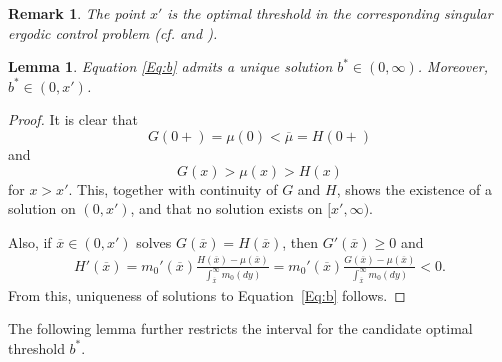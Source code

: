 \documentclass[12pt]{article}
\newtheorem{lemma}[theorem]{Lemma}
\newtheorem{remark}[theorem]{Remark}
\begin{document}
\begin{remark}
The point $x'$ is the optimal threshold in the corresponding singular ergodic control problem (cf. \cite{AlvarezHening2022} and \cite{LiangLiuZervos2025}).    
\end{remark}

\begin{lemma} \label{Lemma: Uniqueb}
    Equation \eqref{Eq:b} admits a unique solution $b^*\in(0,\infty)$. Moreover, $b^*\in(0,x')$.
\end{lemma}

\begin{proof}
    It is clear that 
    \[G(0+)=\mu(0)<\overline\mu=H(0+)\] 
    and 
    \[G(x)>\mu(x)> H(x)\]
    for $x>x'$. This, together with continuity of $G$ and $H$, shows 
    the existence of a solution on $(0,x')$, and that no solution exists on $[x',\infty)$.
    
    Also, if $\overline x\in(0,x')$ solves $G(\overline x)=H(\overline x)$, then $G'(\overline x)\geq 0$ and
    \begin{eqnarray*}
        H'(\overline x) = m_0'(\overline x)\frac{H(\overline x)-\mu(\overline x)}{\int_{\overline x}^\infty m_0(dy)}
        = m_0'(\overline x)\frac{G(\overline x)-\mu(\overline x)}{\int_{\overline x}^\infty m_0(dy)} <0.
    \end{eqnarray*}
    From this, uniqueness of solutions to Equation~\eqref{Eq:b} follows.
\end{proof}

The following lemma further restricts the interval for the candidate optimal threshold $b^*$.
\end{document}
